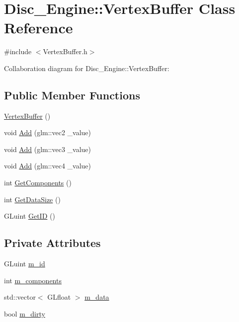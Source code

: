 \hypertarget{class_disc___engine_1_1_vertex_buffer}{}\section{Disc\+\_\+\+Engine\+:\+:Vertex\+Buffer Class Reference}
\label{class_disc___engine_1_1_vertex_buffer}


{\ttfamily \#include $<$Vertex\+Buffer.\+h$>$}



Collaboration diagram for Disc\+\_\+\+Engine\+:\+:Vertex\+Buffer\+:
\subsection*{Public Member Functions}
\begin{DoxyCompactItemize}
\item 
\mbox{\hyperlink{class_disc___engine_1_1_vertex_buffer_adb25d82a47ad82d5b69a75ac111401b8}{Vertex\+Buffer}} ()
\item 
void \mbox{\hyperlink{class_disc___engine_1_1_vertex_buffer_ac184944124f0496e2df432d09529cfb8}{Add}} (glm\+::vec2 \+\_\+value)
\item 
void \mbox{\hyperlink{class_disc___engine_1_1_vertex_buffer_a4e777f9d6b55c794e2c325ac78e65260}{Add}} (glm\+::vec3 \+\_\+value)
\item 
void \mbox{\hyperlink{class_disc___engine_1_1_vertex_buffer_ae5e3477013c5077ef79e5a61b990f0a0}{Add}} (glm\+::vec4 \+\_\+value)
\item 
int \mbox{\hyperlink{class_disc___engine_1_1_vertex_buffer_a214c873c9266454c86ecff510fa0625a}{Get\+Components}} ()
\item 
int \mbox{\hyperlink{class_disc___engine_1_1_vertex_buffer_a5fce06eb2e00088163f3217b139cc460}{Get\+Data\+Size}} ()
\item 
G\+Luint \mbox{\hyperlink{class_disc___engine_1_1_vertex_buffer_a1f73043d77c8680af3eb9ddf8250ec35}{Get\+ID}} ()
\end{DoxyCompactItemize}
\subsection*{Private Attributes}
\begin{DoxyCompactItemize}
\item 
G\+Luint \mbox{\hyperlink{class_disc___engine_1_1_vertex_buffer_aff2fb8248b316fec73d6901a9f2a18e2}{m\+\_\+id}}
\item 
int \mbox{\hyperlink{class_disc___engine_1_1_vertex_buffer_adbf8a59afb1c72edd4fa698bb1873e44}{m\+\_\+components}}
\item 
std\+::vector$<$ G\+Lfloat $>$ \mbox{\hyperlink{class_disc___engine_1_1_vertex_buffer_a0ba240e21c1775fd39bbaaabf488bcd6}{m\+\_\+data}}
\item 
bool \mbox{\hyperlink{class_disc___engine_1_1_vertex_buffer_a46e37735abf40d746e29a1b575411f3d}{m\+\_\+dirty}}
\end{DoxyCompactItemize}


